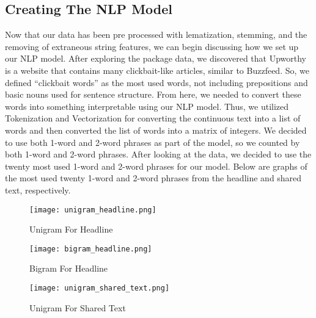 \documentclass{article}
\begin{document}
\subsection{Creating The NLP Model}

\setlength{\parindent}{10pt}

Now that our data has been pre processed with lematization, stemming, and the removing of extraneous string features, we can begin discussing how we set up our NLP model.  After exploring the package data, we discovered that Upworthy is a website that contains many clickbait-like articles, similar to Buzzfeed. So, we defined “clickbait words” as the most used words, not including prepositions and basic nouns used for sentence structure.  From here, we needed to convert these words into something interpretable using our NLP model. Thus, we utilized Tokenization and Vectorization for converting the continuous text into a list of words and then converted the list of words into a matrix of integers.  We decided to use both 1-word and 2-word phrases as part of the model, so we counted by both 1-word and 2-word phrases.  After looking at the data, we decided to use the twenty most used 1-word and 2-word phrases for our model.  Below are graphs of the most used twenty 1-word and 2-word phrases from the headline and shared text, respectively. 

\begin{figure}[h]
\centering
\texttt{[image: unigram\_headline.png]}
\caption{Unigram For Headline}
\end{figure} 

\begin{figure}[h]
\centering
\texttt{[image: bigram\_headline.png]}
\caption{Bigram For Headline}
\end{figure} 

\begin{figure}[h]
\centering
\texttt{[image: unigram\_shared\_text.png]}
\caption{Unigram For Shared Text}
\end{figure} 

\vspace*{5em}
\end{document}
